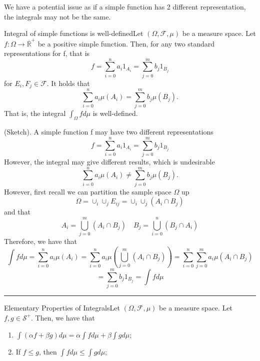 \documentclass[twoside]{article}
\newenvironment{proof}{{\bf Proof:}}{\hfill\rule{2mm}{2mm}}
\newcommand{\sigmalgebra}{\mathcal{F}}
\newcommand{\positiveextendedreal}{\overline{\mathbb{R}}^+}
\begin{document}
\newpage
We have a potential issue as if a simple function has 2 different representation, the integrals may not be the same.
\begin{proposition_exam}{Integral of simple functions is well-defined}{}Let $(\Omega, \sigmalgebra, \mu)$ be a measure space. Let $f: \Omega \rightarrow \positiveextendedreal$ be a positive simple function. Then, for any two standard representations for f, that is 
$$
f = \sum_{i=0}^{n}a_i1_{A_{i}} = \sum_{j=0}^{m}b_j1_{B_{j}}
$$
for $E_i,F_j \in \sigmalgebra$. It holds that 
$$
\sum_{i=0}^{n}a_i\mu(A_{i}) = \sum_{j=0}^{m}b_j\mu(B_{j}).
$$
That is, the integral $\int_{\Omega}fd\mu$ is well-defined.
\end{proposition_exam}

\begin{proof}(Sketch). A simple function f may have two different representations 
$$
f = \sum_{i=0}^{n}a_i1_{A_{i}} = \sum_{j=0}^{m}b_j1_{B_{j}}
$$
However, the integral may give different results, which is undesirable
$$
\sum_{i=0}^{n}a_i\mu(A_{i}) \neq \sum_{j=0}^{m}b_j\mu(B_{j}).
$$
However, first recall we can partition the sample space $\Omega$ up
$$
\Omega = \cup_i\cup_j E_{ij} = \cup_i\cup_j (A_i \cap B_j)
$$
and that 
$$
A_i = \bigcup_{j=0}^{m}(A_i \cap B_j) \quad B_j = \bigcup_{i=0}^{n}(B_j \cap A_i)
$$
Therefore, we have that 
$$
\int fd\mu = \sum_{i=0}^{n}a_i\mu(A_i) = \sum_{i=0}^{n}a_i\mu(\bigcup_{j=0}^{m}(A_i \cap B_j)) = \sum_{i=0}^{n}\sum_{j=0}^{m}a_i\mu(A_i \cap B_j)
$$
$$
= \sum_{j=0}^{m}b_j1_{B_{j}} = \int fd\mu
$$
\end{proof}

\begin{proposition_exam}{Elementary Properties of Integrals}{}Let $(\Omega, \sigmalgebra, \mu)$ be a measure space. Let $f, g \in \mathcal{S}^+$. Then, we have that 
\begin{enumerate}
\item $\int(\alpha f + \beta g)d\mu = \alpha \int fd\mu + \beta \int g d\mu$;
\item If $f \leq g$, then $\int f d\mu \leq \int g d\mu$;
\end{enumerate}
\end{proposition_exam}
\end{document}
